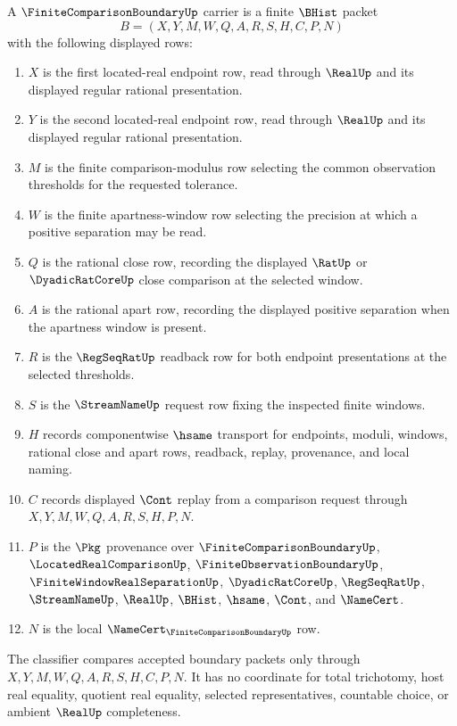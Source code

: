 \begin{definition}
\label{def:finite-comparison-boundary-carrier}
A $\FiniteComparisonBoundaryUp$ carrier is a finite $\BHist$ packet
$$
B=(X,Y,M,W,Q,A,R,S,H,C,P,N)
$$
with the following displayed rows:
\begin{enumerate}
\item $X$ is the first located-real endpoint row, read through $\RealUp$ and its displayed regular rational presentation.
\item $Y$ is the second located-real endpoint row, read through $\RealUp$ and its displayed regular rational presentation.
\item $M$ is the finite comparison-modulus row selecting the common observation thresholds for the requested tolerance.
\item $W$ is the finite apartness-window row selecting the precision at which a positive separation may be read.
\item $Q$ is the rational close row, recording the displayed $\RatUp$ or $\DyadicRatCoreUp$ close comparison at the selected window.
\item $A$ is the rational apart row, recording the displayed positive separation when the apartness window is present.
\item $R$ is the $\RegSeqRatUp$ readback row for both endpoint presentations at the selected thresholds.
\item $S$ is the $\StreamNameUp$ request row fixing the inspected finite windows.
\item $H$ records componentwise $\hsame$ transport for endpoints, moduli, windows, rational close and apart rows, readback, replay, provenance, and local naming.
\item $C$ records displayed $\Cont$ replay from a comparison request through $X,Y,M,W,Q,A,R,S,H,P,N$.
\item $P$ is the $\Pkg$ provenance over $\FiniteComparisonBoundaryUp$, $\LocatedRealComparisonUp$, $\FiniteObservationBoundaryUp$, $\FiniteWindowRealSeparationUp$, $\DyadicRatCoreUp$, $\RegSeqRatUp$, $\StreamNameUp$, $\RealUp$, $\BHist$, $\hsame$, $\Cont$, and $\NameCert$.
\item $N$ is the local $\NameCert_{\FiniteComparisonBoundaryUp}$ row.
\end{enumerate}
The classifier compares accepted boundary packets only through $X,Y,M,W,Q,A,R,S,H,C,P,N$. It has no coordinate for total trichotomy, host real equality, quotient real equality, selected representatives, countable choice, or ambient $\RealUp$ completeness.
\end{definition}

